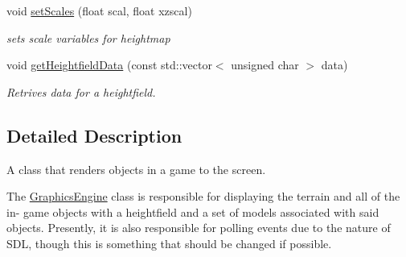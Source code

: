 \begin{DoxyCompactItemize}
void \hyperlink{classgraphics_1_1_graphics_engine_a9a8161aa35dac0cbd41bc196dbd2955c}{set\+Scales} (float scal, float xzscal)
\begin{DoxyCompactList}\small\item\em sets scale variables for heightmap \end{DoxyCompactList}\item 
void \hyperlink{classgraphics_1_1_graphics_engine_a85e16ef5c33aa542e36cc977632fe91d}{get\+Heightfield\+Data} (const std\+::vector$<$ unsigned char $>$ data)
\begin{DoxyCompactList}\small\item\em Retrives data for a heightfield. \end{DoxyCompactList}\end{DoxyCompactItemize}


\subsection{Detailed Description}
A class that renders objects in a game to the screen. 

The \hyperlink{classgraphics_1_1_graphics_engine}{Graphics\+Engine} class is responsible for displaying the terrain and all of the in-\/ game objects with a heightfield and a set of models associated with said objects. Presently, it is also responsible for polling events due to the nature of S\+D\+L, though this is something that should be changed if possible.

